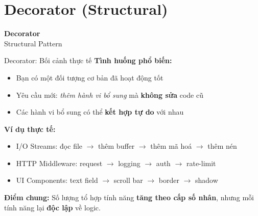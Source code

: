 \section{Decorator (Structural)}

\begin{frame}
  \begin{center}
    \Huge\textbf{Decorator}\\[0.5em]
    \Large\textcolor{myorange}{Structural Pattern}
  \end{center}
\end{frame}

\begin{frame}{Decorator: Bối cảnh thực tế}
  \textbf{Tình huống phổ biến:}
  \begin{itemize}
    \item Bạn có một đối tượng cơ bản đã hoạt động tốt
    \item Yêu cầu mới: \textit{thêm hành vi bổ sung} mà \textbf{không sửa} code cũ
    \item Các hành vi bổ sung có thể \textbf{kết hợp tự do} với nhau
  \end{itemize}

  \vspace{0.5em}
  \textbf{Ví dụ thực tế:}
  \begin{itemize}
    \item \textcolor{myblue}{I/O Streams}: đọc file $\rightarrow$ thêm buffer $\rightarrow$ thêm mã hoá $\rightarrow$ thêm nén
    \item \textcolor{myblue}{HTTP Middleware}: request $\rightarrow$ logging $\rightarrow$ auth $\rightarrow$ rate-limit
    \item \textcolor{myblue}{UI Components}: text field $\rightarrow$ scroll bar $\rightarrow$ border $\rightarrow$ shadow
  \end{itemize}

  \vspace{0.5em}
  \textcolor{myred}{\textbf{Điểm chung:}} Số lượng tổ hợp tính năng \textbf{tăng theo cấp số nhân},
  nhưng mỗi tính năng lại \textbf{độc lập} về logic.
\end{frame}

